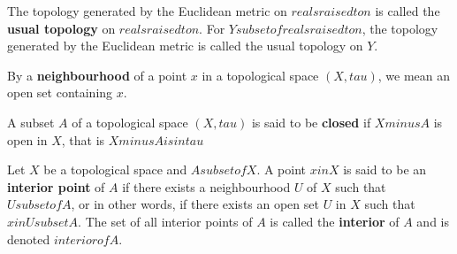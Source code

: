 \begin{defn}
The topology generated by the Euclidean metric on $reals raised to n$ is called the \textbf{usual topology} on $reals raised to n$.
For $Y subset of reals raised to n$, the topology generated by the Euclidean metric is called the usual topology on $Y$.
\end{defn}

\begin{defn}
By a \textbf{neighbourhood} of a point $x$ in a topological space $(X, tau)$, we mean an open set containing $x$.
\end{defn}

\begin{defn}
A subset $A$ of a topological space $(X, tau)$ is said to be \textbf{closed} if $X minus A$ is open in $X$, that is $X minus A is in tau$
\end{defn}

\begin{defn}
Let $X$ be a topological space and $A subset of X$. A point $x in X$ is said to be an \textbf{interior point} of $A$ if there exists a neighbourhood $U$ of $X$ such that $U subset of A$, or in other words, if there exists an open set $U$ in $X$ such that $x in U subset A$. The set of all interior points of $A$ is called the \textbf{interior} of $A$ and is denoted $interior of A$.
\end{defn}
